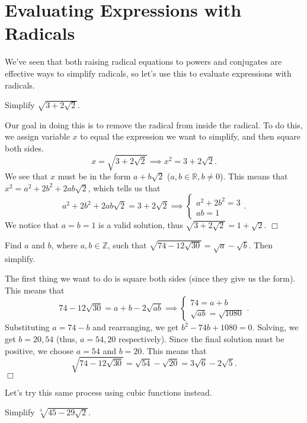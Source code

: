 \documentclass[lang=en,11pt]{elegantbook}
\begin{document}
\section{Evaluating Expressions with Radicals}
\noindent We've seen that both raising radical equations to powers and conjugates are effective ways to simplify radicals, so let's use this to evaluate expressions with radicals.
\begin{example}
Simplify $\sqrt{3+2\sqrt{2}}$.
\end{example}
\begin{solution}
Our goal in doing this is to remove the radical from inside the radical.  To do this, we assign variable $x$ to equal the expression we want to simplify, and then square both sides.  $$x=\sqrt{3+2\sqrt{2}} \implies x^2=3+2\sqrt{2}.$$  We see that $x$ must be in the form $a+b\sqrt{2}$ ($a,b\in\mathbb{R},b\neq 0$).  This means that $x^2=a^2+2b^2+2ab\sqrt{2}$, which tells us that $$a^2+2b^2+2ab\sqrt{2}=3+2\sqrt{2} \implies\begin{cases} a^2+2b^2=3 \\ ab=1\end{cases}.$$  We notice that $a=b=1$ is a valid solution, thus $\sqrt{3+2\sqrt{2}}=1+\sqrt{2}$. $\Box$
\end{solution}
\begin{example}
Find $a$ and $b$, where $a,b\in\mathbb{Z}$, such that $\sqrt{74-12\sqrt{30}}=\sqrt{a}-\sqrt{b}$. Then simplify.
\end{example}
\begin{solution}
The first thing we want to do is square both sides (since they give us the form).  This means that $$74-12\sqrt{30}=a+b-2\sqrt{ab} \implies \begin{cases} 74=a+b \\ \sqrt{ab}=\sqrt{1080}\end{cases}.$$ Substituting $a=74-b$ and rearranging, we get $b^2-74b+1080=0$.  Solving, we get $b=20,54$ (thus, $a=54,20$ respectively).  Since the final solution must be positive, we choose $a=54$ and $b=20$.  This means that $$\sqrt{74-12\sqrt{30}}=\sqrt{54}-\sqrt{20}=3\sqrt{6}-2\sqrt{5}.$$ $\Box$
\end{solution}
Let's try this same process using cubic functions instead.
\begin{example}
Simplify $\sqrt[3]{45-29\sqrt{2}}$.
\end{example}
\end{document}
